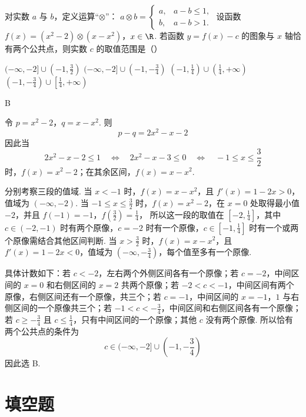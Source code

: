 \begin{problem}
对实数 \(a\) 与 \(b\)，定义运算“\(\otimes\)”： \(a \otimes b = \begin{cases}
a, & a - b \leqslant 1,\\
b, & a - b > 1.
\end{cases}\) 设函数 \(f(x) = (x^2 - 2) \otimes (x - x^2)\)，\(x \in \R\). 若函数 \(y = f(x) - c\) 的图象与 \(x\) 轴恰有两个公共点，则实数 \(c\) 的取值范围是（\quad）

\choices
    {\((- \infty, -2] \cup \left(-1, \frac{3}{2}\right)\)}
    {\((-\infty, -2] \cup \left(-1, -\frac{3}{4}\right)\)}
    {\(\left(-1, \frac{1}{4}\right) \cup \left(\frac{1}{4}, +\infty\right)\)}
    {\(\left(-1, -\frac{3}{4}\right) \cup \left[\frac{1}{4}, +\infty\right)\)}
\begin{answer}
B
\end{answer}

\begin{solution}
令 \(p=x^2-2\)，\(q=x-x^2\). 则
\[
p-q=2x^2-x-2
\]
因此当
\[
2x^2-x-2\leqslant1
\quad\Longleftrightarrow\quad
2x^2-x-3\leqslant0
\quad\Longleftrightarrow\quad
-1\leqslant x\leqslant\frac32
\]
时，\(f(x)=x^2-2\)；在其余区间，\(f(x)=x-x^2\).

分别考察三段的值域. 当 \(x<-1\) 时，\(f(x)=x-x^2\)，且 \(f'(x)=1-2x>0\)，值域为
\((-\infty,-2)\). 当 \(-1\leqslant x\leqslant\frac32\) 时，\(f(x)=x^2-2\)，在 \(x=0\) 处取得最小值 \(-2\)，并且
\(f(-1)=-1\)，\(f\left(\frac32\right)=\frac14\)，
所以这一段的取值在 \([-2,\frac{1}{4}]\)，其中 \(c\in(-2,-1)\) 时有两个原像，\(c=-2\) 时有一个原像，\(c\in[-1,\frac{1}{4}]\) 时有一个或两个原像需结合其他区间判断. 当 \(x>\frac32\) 时，\(f(x)=x-x^2\)，且 \(f'(x)=1-2x<0\)，值域为 \((-\infty,-\frac{3}{4})\)，每个值至多有一个原像.

具体计数如下：若 \(c<-2\)，左右两个外侧区间各有一个原像；若 \(c=-2\)，中间区间的 \(x=0\) 和右侧区间的 \(x=2\) 共两个原像；若 \(-2<c<-1\)，中间区间有两个原像，右侧区间还有一个原像，共三个；若 \(c=-1\)，中间区间的 \(x=-1\)，\(1\) 与右侧区间的一个原像共三个；若 \(-1<c<-\frac{3}{4}\)，中间区间和右侧区间各有一个原像；若 \(c\geqslant-\frac{3}{4}\) 且 \(c\leqslant\frac{1}{4}\)，只有中间区间的一个原像；其他 \(c\) 没有两个原像. 所以恰有两个公共点的条件为
\[
c\in(-\infty,-2]\cup\left(-1,-\frac34\right)
\]
因此选 B.
\end{solution}
\end{problem}

\section{填空题}

